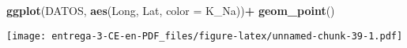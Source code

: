 \documentclass[
]{article}
\newenvironment{Shaded}{\begin{snugshade}}{\end{snugshade}}
\newcommand{\DataTypeTok}[1]{\textcolor[rgb]{0.13,0.29,0.53}{#1}}
\newcommand{\DecValTok}[1]{\textcolor[rgb]{0.00,0.00,0.81}{#1}}
\newcommand{\KeywordTok}[1]{\textcolor[rgb]{0.13,0.29,0.53}{\textbf{#1}}}
\newcommand{\NormalTok}[1]{#1}
\newcommand{\OperatorTok}[1]{\textcolor[rgb]{0.81,0.36,0.00}{\textbf{#1}}}
\newcommand{\StringTok}[1]{\textcolor[rgb]{0.31,0.60,0.02}{#1}}
\begin{document}
\begin{Shaded}
\begin{Highlighting}[]
\KeywordTok{ggplot}\NormalTok{(DATOS, }\KeywordTok{aes}\NormalTok{(Long, Lat, }\DataTypeTok{color =}\NormalTok{ K_Na))}\OperatorTok{+}
\StringTok{  }\KeywordTok{geom_point}\NormalTok{()}
\end{Highlighting}
\end{Shaded}

\texttt{[image: entrega-3-CE-en-PDF\_files/figure-latex/unnamed-chunk-39-1.pdf]}

\begin{Shaded}
\end{Shaded}
\end{document}
